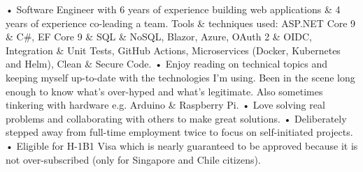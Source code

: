

\begin{cvparagraph}

• Software Engineer with 6 years of experience building web applications \& 4 years of experience co-leading a team. Tools \& techniques used: ASP.NET Core 9 \& C\#, EF Core 9 \& SQL \& NoSQL, Blazor, Azure, OAuth 2 \& OIDC, Integration \& Unit Tests, GitHub Actions, Microservices (Docker, Kubernetes and Helm), Clean \& Secure Code.
\newline
• Enjoy reading on technical topics and keeping myself up-to-date with the technologies I'm using. Been in the scene long enough to know what's over-hyped and what's legitimate. Also sometimes tinkering with hardware e.g. Arduino \& Raspberry Pi.
\newline
• Love solving real problems and collaborating with others to make great solutions.
\newline
• Deliberately stepped away from full-time employment twice to focus on self-initiated projects.
\newline
• Eligible for H-1B1 Visa which is nearly guaranteed to be approved because it is not over-subscribed (only for Singapore and Chile citizens).
\end{cvparagraph}

